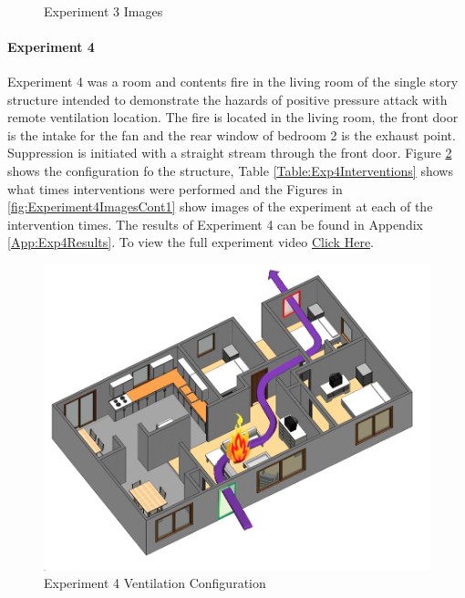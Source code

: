 \documentclass{article}
\begin{document}
\begin{figure}[H]
	\ContinuedFloat 
	\centering 
	 \ 
	\caption{Experiment 3 Images}
	\label{fig:Experiment3ImagesCont3} 
\end{figure}

\paragraph{Experiment 4}\mbox{}

Experiment 4 was a room and contents fire in the living room of the single story structure intended to demonstrate the hazards of positive pressure attack with remote ventilation location. The fire is located in the living room, the front door is the intake for the fan and the rear window of bedroom 2 is the exhaust point. Suppression is initiated with a straight stream through the front door. Figure \ref{fig:Exp4VentConfig} shows the configuration fo the structure, Table \ref{Table:Exp4Interventions} shows what times interventions were performed and the Figures in \ref{fig:Experiment4ImagesCont1} show images of the experiment at each of the intervention times. The results of Experiment 4 can be found in Appendix \ref{App:Exp4Results}. To view the full experiment video \href{https://youtu.be/RPpYMvXUp}{Click Here}.

\begin{figure}[H]
	\centering
	\includegraphics[width=5in]{0_Images/FireExperiments/Single_Story/Experiment_4.jpg}
	\caption{Experiment 4 Ventilation Configuration}
	\label{fig:Exp4VentConfig}
\end{figure}
\end{document}
